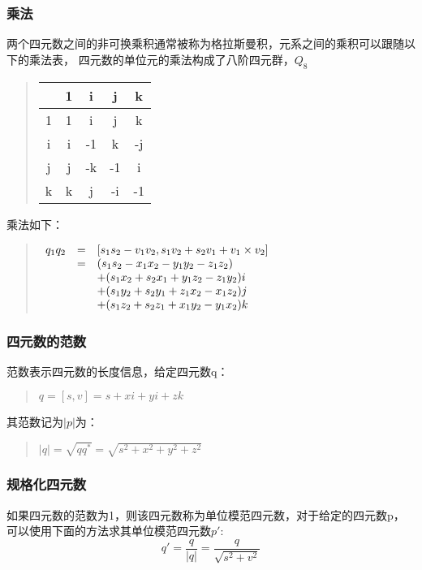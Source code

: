 \documentclass[a4paper,10pt]{article}
\begin{document}
\begin{CJK}{UTF8}{song}
\subsubsection{乘法}
两个四元数之间的非可换乘积通常被称为格拉斯曼积，元系之间的乘积可以跟随以下的乘法表， 四元数的单位元的乘法构成了八阶四元群，$Q_{8}$
\begin{quote}
\begin{tabular}{c|c|c|c|c}
 & 1 & i & j & k \\ 
\hline 
1 & 1 & i & j & k \\
\hline 
i & i & -1 & k & -j \\
\hline 
j & j & -k & -1 & i \\
\hline 
k & k & j & -i & -1 \\
\end{tabular}
\end{quote}
乘法如下：
\begin{quote}
\begin{math}
\begin{array}{ccl}
q_{1}q_{2}& = &[s_{1}s_{2}-v_{1}{v_2},s_{1}v_{2}+s_{2}v_{1}+v_{1}\times{}v_{2}] \\
          & = &(s_{1}s_{2}-x_{1}x_{2}-y_{1}y_{2}-z_{1}z_{2})  \\
	  &  &+(s_{1}x_{2}+s_{2}x_{1}+y_{1}z_{2}-z_{1}y_{2}) i \\
          &  &+(s_{1}y_{2}+s_{2}y_{1}+z_{1}x_{2}-x_{1}z_{2}) j \\
          &  &+(s_{1}z_{2}+s_{2}z_{1}+x_{1}y_{2}-y_{1}x_{2}) k \\
\end{array} \\
\end{math}
\end{quote}

\subsubsection{四元数的范数}
范数表示四元数的长度信息，给定四元数q：
\begin{quote}
$ q=[s,v]=s+xi+yi+zk $
\end{quote}
其范数记为$|p|$为：
\begin{quote}
$|q|=\sqrt{qq^{*}}=\sqrt{s^{2}+x^{2}+y^{2}+z^{2}}$
\end{quote}
\subsubsection{规格化四元数}
如果四元数的范数为1，则该四元数称为单位模范四元数，对于给定的四元数p，可以使用下面的方法求其单位模范四元数$p'$:
\begin{displaymath}
q'=\frac{q}{|q|}=\frac{q}{\sqrt{s^2+v^2}}
\end{displaymath}






\end{CJK}
\end{document}

